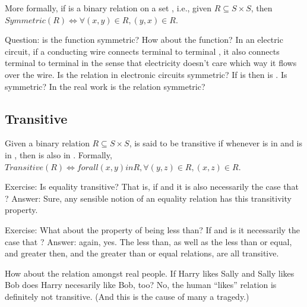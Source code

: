 \documentclass[letterpaper,10pt,english]{sphinxmanual}
\begin{document}
More formally, if  is a binary relation on a set , i.e., given
\(R \subseteq S \times S\), then \(Symmetric(R) \iff \forall
(x,y) \in R, (y,x) \in R\).

Question: is the function  symmetric? How about the 
function? In an electric circuit, if a conducting wire connects
terminal  to terminal , it also connects terminal  to
terminal  in the sense that electricity doesn’t care which way it
flows over the wire. Is the  relation in electronic circuits
symmetric? If  is   then  is  . Is 
symmetric? In the real work is the  relation symmetric?


\subsection{Transitive}
\label{\detokenize{08-relations:transitive}}
Given a binary relation \(R \subseteq S \times S\),  is said to
be transitive if whenever  is in  and  is in ,
then  is also in . Formally, \(Transitive(R) \iff
forall (x,y) in R, \forall (y,z) \in R, (x,z) \in R\).

Exercise: Is equality transitive? That is, if  and  it
is also necessarily the case that ? Answer: Sure, any sensible
notion of an equality relation has this transitivity property.

Exercise: What about the property of being less than? If  and
 is it necessarily the case that ? Answer: again,
yes. The less than, as well as the less than or equal, and greater
then, and the greater than or equal relations, are all transitive.

How about the  relation amongst real people. If Harry likes
Sally and Sally likes Bob does Harry necesarily like Bob, too? No, the
human “likes” relation is definitely not transitive. (And this is the
cause of many a tragedy.)
\end{document}
